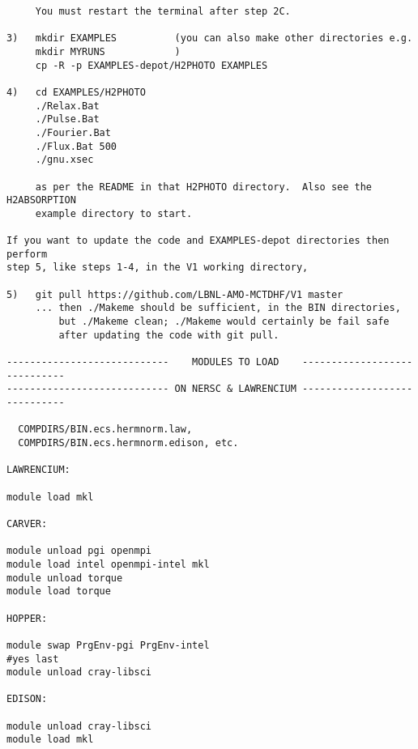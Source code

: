 \begin{verbatim}
     You must restart the terminal after step 2C.

3)   mkdir EXAMPLES          (you can also make other directories e.g. 
     mkdir MYRUNS            )
     cp -R -p EXAMPLES-depot/H2PHOTO EXAMPLES

4)   cd EXAMPLES/H2PHOTO
     ./Relax.Bat
     ./Pulse.Bat
     ./Fourier.Bat 
     ./Flux.Bat 500
     ./gnu.xsec

     as per the README in that H2PHOTO directory.  Also see the H2ABSORPTION
     example directory to start.
 
If you want to update the code and EXAMPLES-depot directories then perform 
step 5, like steps 1-4, in the V1 working directory,

5)   git pull https://github.com/LBNL-AMO-MCTDHF/V1 master
     ... then ./Makeme should be sufficient, in the BIN directories,
         but ./Makeme clean; ./Makeme would certainly be fail safe
         after updating the code with git pull.

----------------------------    MODULES TO LOAD    -----------------------------
---------------------------- ON NERSC & LAWRENCIUM -----------------------------

  COMPDIRS/BIN.ecs.hermnorm.law, 
  COMPDIRS/BIN.ecs.hermnorm.edison, etc.

LAWRENCIUM:

module load mkl

CARVER:

module unload pgi openmpi
module load intel openmpi-intel mkl
module unload torque
module load torque

HOPPER:

module swap PrgEnv-pgi PrgEnv-intel
#yes last
module unload cray-libsci

EDISON:

module unload cray-libsci
module load mkl

\end{verbatim}
